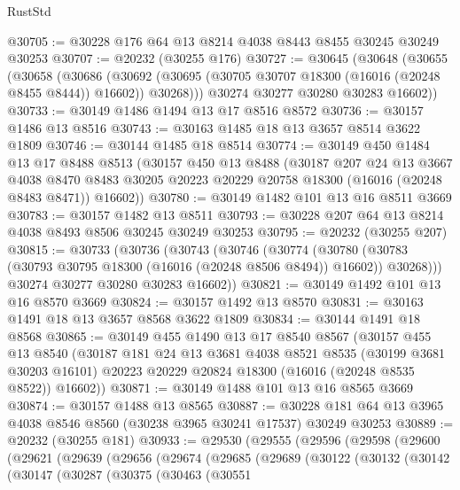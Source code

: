 \begin{lexlean}{RustStd}
\begin{coremodule}
@30705 := @30228 @176 @64 @13 @8214 @4038 @8443 @8455 @30245 @30249 @30253
@30707 := @20232 (@30255 @176)
@30727 := @30645
    (@30648
      (@30655
        (@30658
          (@30686
            (@30692 (@30695 (@30705 @30707 @18300 (@16016 (@20248 @8455 @8444)) @16602)) @30268)))
        @30274
        @30277
        @30280
        @30283
        @16602))
@30733 := @30149 @1486 @1494 @13 @17 @8516 @8572
@30736 := @30157 @1486 @13 @8516
@30743 := @30163 @1485 @18 @13 @3657 @8514 @3622 @1809
@30746 := @30144 @1485 @18 @8514
@30774 := @30149
    @450
    @1484
    @13
    @17
    @8488
    @8513
    (@30157
      @450
      @13
      @8488
      (@30187
        @207
        @24
        @13
        @3667
        @4038
        @8470
        @8483
        @30205
        @20223
        @20229
        @20758
        @18300
        (@16016 (@20248 @8483 @8471))
        @16602))
@30780 := @30149 @1482 @101 @13 @16 @8511 @3669
@30783 := @30157 @1482 @13 @8511
@30793 := @30228 @207 @64 @13 @8214 @4038 @8493 @8506 @30245 @30249 @30253
@30795 := @20232 (@30255 @207)
@30815 := @30733
    (@30736
      (@30743
        (@30746
          (@30774
            (@30780 (@30783 (@30793 @30795 @18300 (@16016 (@20248 @8506 @8494)) @16602)) @30268)))
        @30274
        @30277
        @30280
        @30283
        @16602))
@30821 := @30149 @1492 @101 @13 @16 @8570 @3669
@30824 := @30157 @1492 @13 @8570
@30831 := @30163 @1491 @18 @13 @3657 @8568 @3622 @1809
@30834 := @30144 @1491 @18 @8568
@30865 := @30149
    @455
    @1490
    @13
    @17
    @8540
    @8567
    (@30157
      @455
      @13
      @8540
      (@30187
        @181
        @24
        @13
        @3681
        @4038
        @8521
        @8535
        (@30199 @3681 @30203 @16101)
        @20223
        @20229
        @20824
        @18300
        (@16016 (@20248 @8535 @8522))
        @16602))
@30871 := @30149 @1488 @101 @13 @16 @8565 @3669
@30874 := @30157 @1488 @13 @8565
@30887 := @30228 @181 @64 @13 @3965 @4038 @8546 @8560 (@30238 @3965 @30241 @17537) @30249 @30253
@30889 := @20232 (@30255 @181)
@30933 := @29530
    (@29555
      (@29596
        (@29598
          (@29600
            (@29621
              (@29639
                (@29656
                  (@29674
                    (@29685
                      (@29689
                        (@30122
                          (@30132
                            (@30142
                              (@30147
                                (@30287
                                  (@30375
                                    (@30463
                                      (@30551

\end{coremodule}
\end{lexlean}

